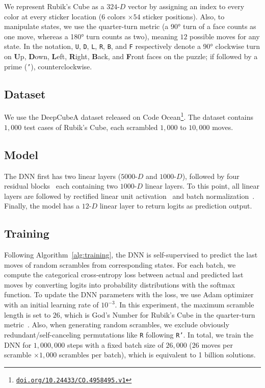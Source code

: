 \documentclass[nohyperref]{article}
\theoremstyle{plain}
\theoremstyle{definition}
\theoremstyle{remark}
\newcommand\rurl[1]{\href{http://#1}{\nolinkurl{#1}}}
\begin{document}
We represent Rubik's Cube as a $324$-$D$ vector by assigning an index to every color at every sticker location ($6$ colors $\times 54$ sticker positions).
Also, to manipulate states, we use the quarter-turn metric (a 90° turn of a face counts as one move, whereas a 180° turn counts as two), meaning $12$ possible moves for any state.
In the notation, \texttt{U}, \texttt{D}, \texttt{L}, \texttt{R}, \texttt{B}, and \texttt{F} respectively denote a 90° clockwise turn on \textbf{U}p, \textbf{D}own, \textbf{L}eft, \textbf{R}ight, \textbf{B}ack, and \textbf{F}ront faces on the puzzle; if followed by a prime (\texttt{'}), counterclockwise.

\vspace{-0.1em}
\subsection{Dataset}
We use the DeepCubeA dataset released on Code Ocean\footnote{\rurl{doi.org/10.24433/CO.4958495.v1}}.
The dataset contains $1,000$ test cases of Rubik's Cube, each scrambled $1,000$ to $10,000$ moves.

\subsection{Model}
The DNN first has two linear layers ($5000$-$D$ and $1000$-$D$), followed by four residual blocks~\citep{he2016deep} each containing two $1000$-$D$ linear layers.
To this point, all linear layers are followed by rectified linear unit activation~\citep{nair2010rectified, glorot2011deep} and batch normalization~\citep{ioffe2015batch}.
Finally, the model has a $12$-$D$ linear layer to return logits as prediction output.

\subsection{Training}
Following Algorithm~\ref{alg:training}, the DNN is self-supervised to predict the last moves of random scrambles from corresponding states.
For each batch, we compute the categorical cross-entropy loss between actual and predicted last moves by converting logits into probability distributions with the softmax function.
To update the DNN parameters with the loss, we use Adam optimizer~\citep{kingma2014adam} with an initial learning rate of $10^{-3}$.
In this experiment, the maximum scramble length is set to $26$, which is God's Number for Rubik's Cube in the quarter-turn metric~\citep{kunkle2007twenty}.
Also, when generating random scrambles, we exclude obviously redundant/self-canceling permutations like \texttt{R} following \texttt{R'}.
In total, we train the DNN for $1,000,000$ steps with a fixed batch size of $26,000$ ($26$ moves per scramble $\times 1,000$ scrambles per batch), which is equivalent to 1 billion solutions.
\end{document}
